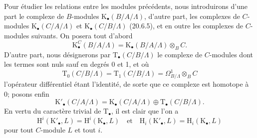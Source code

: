\begin{env}[20.6.15]
\label{0.20.6.15-fr}
Pour étudier les relations entre les modules précédents, nous introduirons
d'une part le complexe de $B$-modules
$\mathrm{K}_\bullet(B/A/\Lambda)$, d'autre part, les complexes
de $C$-modules $\mathrm{K}_\bullet(C/A/\Lambda)$ et
$\mathrm{K}_\bullet(C/B/\Lambda)$ (20.6.5), et en outre les complexes de
$C$-modules suivants. On posera tout d'abord
\begin{equation}
\tag{20.6.15.1}
\label{0.20.6.15.1-fr}
  \mathrm{K}^C_\bullet(B/A/\Lambda)=
  \mathrm{K}_\bullet(B/A/\Lambda)\otimes_B C.
\end{equation}
D'autre part, nous désignerons par $\mathrm{T}_\bullet(C/B/\Lambda)$ le
complexe de $C$-modules dont les termes sont nuls sauf en degrés 0 et 1,
et où
\begin{equation}
\tag{20.6.15.2}
\label{0.20.6.15.2-fr}
  \mathrm{T}_0(C/B/\Lambda)=\mathrm{T}_1(C/B/\Lambda)=
  \Omega^1_{B/\Lambda}\otimes_B C
\end{equation}
l'opérateur différentiel étant l'identité, de sorte que ce complexe est
homotope à 0; posons enfin
\begin{equation}
\tag{20.6.15.3}
\label{0.20.6.15.3-fr}
  \mathrm{K}'_\bullet(C/A/\Lambda)=
  \mathrm{K}_\bullet(C/A/\Lambda)\oplus
  \mathrm{T}_\bullet(C/B/\Lambda).
\end{equation}
En vertu du caractère trivial de $\mathrm{T}_\bullet$, il est clair que
l'on a
\begin{equation}
\tag{20.6.15.4}
\label{0.20.6.15.4-fr}
  \mathrm{H}^i(\mathrm{K}'_\bullet,L)=
  \mathrm{H}^i(\mathrm{K}_\bullet,L)
  \quad\text{et}\quad
  \mathrm{H}_i(\mathrm{K}'_\bullet,L)=
  \mathrm{H}_i(\mathrm{K}_\bullet,L)
\end{equation}
pour tout $C$-module $L$ et tout $i$.
\end{env}
